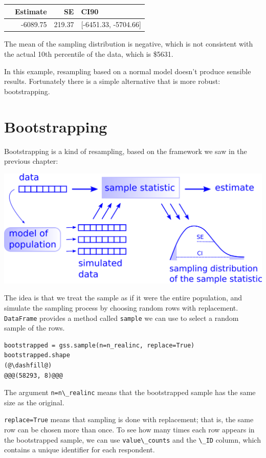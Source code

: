 \begin{tabular}{lrrl}
\midrule
{} &  Estimate &      SE &                  CI90 \\
\midrule
{} &  -6089.75 &  219.37 &  [-6451.33, -5704.66] \\
\midrule
\end{tabular}

The mean of the sampling distribution is negative, which is not
consistent with the actual 10th percentile of the data, which is \$5631.

In this example, resampling based on a normal model doesn't produce
sensible results. Fortunately there is a simple alternative that is more
robust: bootstrapping.

\hypertarget{bootstrapping}{%
\section{Bootstrapping}\label{bootstrapping}}

Bootstrapping is a kind of resampling, based on the framework we saw in
the previous chapter:

\includegraphics{chapters/figs/resampling.png}

The idea is that we treat the sample as if it were the entire
population, and simulate the sampling process by choosing random rows
with replacement. \passthrough{\lstinline!DataFrame!} provides a method
called \passthrough{\lstinline!sample!} we can use to select a random
sample of the rows.

\begin{lstlisting}[]
bootstrapped = gss.sample(n=n_realinc, replace=True)
bootstrapped.shape
(@\dashfill@)
@@@(58293, 8)@@@
\end{lstlisting}

The argument \passthrough{\lstinline!n=n\_realinc!} means that the
bootstrapped sample has the same size as the original.

\passthrough{\lstinline!replace=True!} means that sampling is done with
replacement; that is, the same row can be chosen more than once. To see
how many times each row appears in the bootstrapped sample, we can use
\passthrough{\lstinline!value\_counts!} and the
\passthrough{\lstinline!\_ID!} column, which contains a unique
identifier for each respondent.


